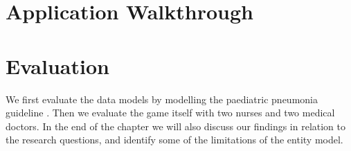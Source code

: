\documentclass[a4paper,12pt,oneside]{book}
\begin{document}
\chapter{Application Walkthrough}




\chapter{Evaluation}
We first evaluate the data models by modelling the paediatric pneumonia guideline \parencite{RepublicofKeny2016}. Then we evaluate the game itself with two nurses and two medical doctors. In the end of the chapter we will also discuss our findings in relation to the research questions, and identify some of the limitations of the entity model.





\end{document}
